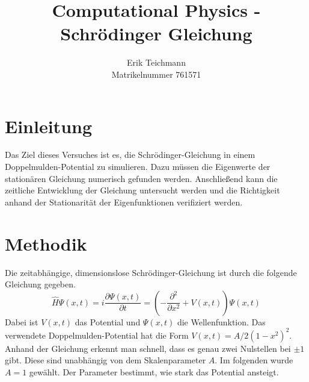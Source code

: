 \documentclass[a4paper, 11pt]{scrartcl}
\author{Erik Teichmann\\
Matrikelnummer 761571}
\title{Computational Physics - Schrödinger Gleichung}
\begin{document}

\let\endtitlepage\relax
{}

\section{Einleitung}
Das Ziel dieses Versuches ist es, die Schrödinger-Gleichung in einem Doppelmulden-Potential zu simulieren. Dazu müssen die Eigenwerte der stationären Gleichung numerisch gefunden werden. Anschließend kann die zeitliche Entwicklung der Gleichung untersucht werden und die Richtigkeit anhand der Stationarität der Eigenfunktionen verifiziert werden.

\section{Methodik}
Die zeitabhängige, dimensionslose Schrödinger-Gleichung ist durch die folgende Gleichung gegeben.
%
\begin{equation}
\hat{H} \Psi(x, t) = i \frac{\partial \Psi(x, t)}{\partial t} = \left( - \frac{\partial^2}{\partial x^2}  + V(x, t) \right) \Psi(x, t) \label{eq:time_schroed}
\end{equation}
%
Dabei ist $V(x, t)$ das Potential und $\Psi(x, t)$ die Wellenfunktion. Das verwendete Doppelmulden-Potential hat die Form ${V(x, t) = A/2(1-x^2)^2}$. Anhand der Gleichung erkennt man schnell, dass es genau zwei Nulstellen bei $\pm 1$ gibt. Diese sind unabhängig von dem Skalenparameter $A$. Im folgenden wurde $A = 1$ gewählt. Der Parameter bestimmt, wie stark das Potential ansteigt.
%
\end{document}
